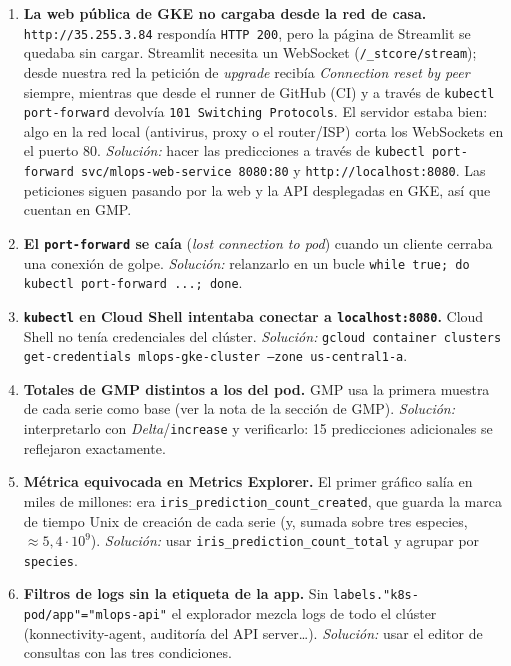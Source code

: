 \documentclass[11pt,a4paper]{article}
\newcommand{\code}[1]{\texttt{#1}}
\newcommand{\metrica}{\code{iris\_prediction\_count\_total}}
\begin{document}
\begin{enumerate}[label=\textbf{D\arabic*.}, ref=D\arabic*, leftmargin=2.4em, itemsep=0.5em]
\item \textbf{La web pública de GKE no cargaba desde la red de casa.}
  \code{http://35.255.3.84} respondía \code{HTTP 200}, pero la página de Streamlit se
  quedaba sin cargar. Streamlit necesita un WebSocket (\code{/\_stcore/stream}); desde
  nuestra red la petición de \emph{upgrade} recibía \emph{Connection reset by peer} siempre,
  mientras que desde el runner de GitHub (CI) y a través de \code{kubectl port-forward}
  devolvía \code{101 Switching Protocols}. El servidor estaba bien: algo en la red local
  (antivirus, proxy o el router/ISP) corta los WebSockets en el puerto 80.
  \emph{Solución:} hacer las predicciones a través de
  \code{kubectl port-forward svc/mlops-web-service 8080:80} y \code{http://localhost:8080}.
  Las peticiones siguen pasando por la web y la API desplegadas en GKE, así que cuentan en GMP.

\item \textbf{El \code{port-forward} se caía} (\emph{lost connection to pod}) cuando un
  cliente cerraba una conexión de golpe. \emph{Solución:} relanzarlo en un bucle
  \code{while true; do kubectl port-forward ...; done}.

\item \textbf{\code{kubectl} en Cloud Shell intentaba conectar a \code{localhost:8080}.}
  Cloud Shell no tenía credenciales del clúster. \emph{Solución:}
  \code{gcloud container clusters get-credentials mlops-gke-cluster --zone us-central1-a}.

\item \textbf{Totales de GMP distintos a los del pod.} GMP usa la primera muestra de cada
  serie como base (ver la nota de la sección de GMP). \emph{Solución:} interpretarlo con
  \emph{Delta}/\code{increase} y verificarlo: 15 predicciones adicionales se reflejaron
  exactamente.

\item \textbf{Métrica equivocada en Metrics Explorer.} El primer gráfico salía en miles de
  millones: era \code{iris\_prediction\_count\_created}, que guarda la marca de tiempo Unix
  de creación de cada serie (y, sumada sobre tres especies, $\approx 5{,}4\cdot 10^9$).
  \emph{Solución:} usar \metrica{} y agrupar por \code{species}.

\item \textbf{Filtros de logs sin la etiqueta de la app.} Sin
  \code{labels."k8s-pod/app"="mlops-api"} el explorador mezcla logs de todo el clúster
  (konnectivity-agent, auditoría del API server\ldots). \emph{Solución:} usar el editor de
  consultas con las tres condiciones.


\end{enumerate}
\end{document}
